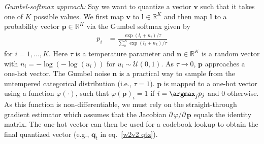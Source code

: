 \textit{Gumbel-softmax approach:} 
Say we want to quantize a vector $\mathbf{v}$ such that it takes one of $K$ possible values. We first map $\mathbf{v}$ to $\mathbf{l} \in \mathbb{R}^K$ and then map $\mathbf{l}$ to a probability vector $\mathbf{p} \in \mathbb{R}^K$ via the Gumbel softmax given by
\begin{align}
    p_i &= \frac{\exp(l_i + n_i) / \tau}{\sum_k^K \exp(l_k + n_k) / \tau} 
\end{align}
for $i=1,\dots,K$. Here $\tau$ is a temperature parameter and $\mathbf{n}\in\mathbb R^K$ is a random vector with $n_i = -\log(-\log(u_i))$ for $u_i \sim \mathcal{U}(0, 1)$.
As  $\tau \rightarrow 0$, $\mathbf{p}$ approaches a one-hot vector. The Gumbel noise $\mathbf{n}$ is a practical way to sample from the untempered categorical distribution (i.e., $\tau = 1$).
$\mathbf{p}$ is mapped to a one-hot vector using a function $\varphi(\cdot)$, such that $\varphi(\mathbf{p})_i = 1$ if $i = \argmax_j p_j$ and $0$ otherwise. 
As this function is non-differentiable, we must rely on the straight-through gradient estimator \cite{bengio2013estimating} which assumes that the Jacobian ${\partial \, \varphi}/{\partial \, \mathbf{p}}$ equals the identity matrix. 
The one-hot vector can then be used for a codebook lookup to obtain the final quantized vector (e.g., $\mathbf{q}_t$ in eq.~\ref{w2v2 qtz}).



